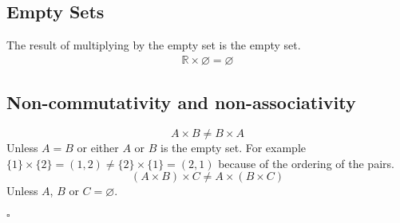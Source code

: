 \documentclass[a4paper]{article}
\begin{document}
\subsection{Empty Sets}
The result of multiplying by the empty set is the empty set.
\begin{align}
  \mathbb{R} \times \varnothing = \varnothing
\end{align}
\subsection{Non-commutativity and non-associativity}
\begin{equation}
  A \times B \neq B \times A
\end{equation}
Unless $A=B$ or either $A$ or $B$ is the empty set. For example $\{1\} \times \{2\} = (1,2) \neq \{2\} \times \{1\} = (2,1)$ because of the ordering of the pairs.
\begin{equation}
  (A \times B) \times C \neq A \times (B \times C)
\end{equation}
Unless $A$, $B$ or $C =\varnothing$.\\ \\
$\square$
\end{document}
